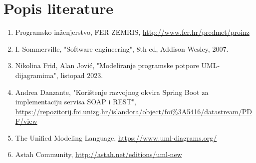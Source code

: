 \chapter*{Popis literature}
	 	
		\begin{enumerate}
			
			
			\item  Programsko inženjerstvo, FER ZEMRIS, \url{http://www.fer.hr/predmet/proinz}
			
			\item  I. Sommerville, "Software engineering", 8th ed, Addison Wesley, 2007.
			
			\item  Nikolina Frid, Alan Jović, "Modeliranje programske potpore UML-dijagramima", listopad 2023.
			
			\item  Andrea Danzante, "Korištenje razvojnog okvira Spring Boot za
			implementaciju servisa SOAP i REST", \url{https://repozitorij.foi.unizg.hr/islandora/object/foi%3A5416/datastream/PDF/view}
			
			\item  The Unified Modeling Language, \url{https://www.uml-diagrams.org/}
			
			\item  Astah Community, \url{http://astah.net/editions/uml-new}
		\end{enumerate}
		
		 